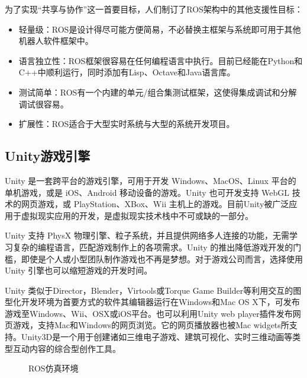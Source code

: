 \documentclass[bachelor]{thesis-uestc}
\begin{document}
	为了实现“共享与协作”这一首要目标，人们制订了ROS架构中的其他支援性目标：
	
	\begin{itemize}
		\item 轻量级：ROS是设计得尽可能方便简易，不必替换主框架与系统即可用于其他机器人软件框架中。
		
		\item 语言独立性：ROS框架很容易在任何编程语言中执行。目前已经能在Python和C++中顺利运行，同时添加有Lisp、Octave和Java语言库。
		
		\item 测试简单：ROS有一个内建的单元/组合集测试框架，这使得集成调试和分解调试很容易。
		
		\item 扩展性：ROS适合于大型实时系统与大型的系统开发项目。
	\end{itemize}

	\subsection{Unity游戏引擎}
	Unity 是一套跨平台的游戏引擎，可用于开发 Windows、MacOS、Linux 平台的单机游戏，或是 iOS、Android 移动设备的游戏。Unity 也可开发支持 WebGL 技术的网页游戏，或 PlayStation、XBox、Wii 主机上的游戏。目前Unity被广泛应用于虚拟现实应用的开发，是虚拟现实技术栈中不可或缺的一部分。
	
	Unity 支持 PhysX 物理引擎、粒子系统，并且提供网络多人连接的功能，无需学习复杂的编程语言，匹配游戏制作上的各项需求。Unity 的推出降低游戏开发的门槛，即使是个人或小型团队制作游戏也不再是梦想。对于游戏公司而言，选择使用 Unity 引擎也可以缩短游戏的开发时间。
	
	Unity 类似于Director，Blender，Virtools或Torque Game Builder等利用交互的图型化开发环境为首要方式的软件其编辑器运行在Windows和Mac OS X下，可发布游戏至Windows、Wii、OSX或iOS平台。也可以利用Unity web player插件发布网页游戏，支持Mac和Windows的网页浏览。它的网页播放器也被Mac widgets所支持。Unity3D是一个用于创建诸如三维电子游戏、建筑可视化、实时三维动画等类型互动内容的综合型创作工具。
	\begin{figure}[h]
		\centering
		\caption{ROS仿真环境}
	\end{figure}
\end{document}
